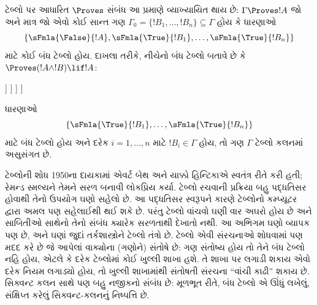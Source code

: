 ટેબ્લો પર આધારિત $\Proves$ સંબંધ આ પ્રમાણે વ્યાખ્યાયિત થાય છે:
$\Gamma \Proves !A$ જો અને માત્ર જો એવો કોઈ સાન્ત ગણ
$\Gamma_0 = \{!B_1, \dots, !B_n\} \subseteq \Gamma$ હોય કે ધારણાઓ
\[
\{\sFmla{\False}{!A}, \sFmla{\True}{!B_1}, \dots, \sFmla{\True}{!B_n}\}
\]
માટે કોઈ બંધ ટેબ્લો હોય. દાખલા તરીકે, નીચેનો બંધ ટેબ્લો
બતાવે છે કે $\Proves (!A \land !B) \lif !A$:
\begin{oltableau}
  [\sFmla{\False}{(\formula{A} \land \formula{B}) \lif \formula{A}}, just = \TAss
    [\sFmla{\True}{\formula{A} \land \formula{B}}, just = {\TRule{\False}{\lif}[1]}
      [\sFmla{\False}{\formula{A}}, just = {\TRule{\False}{\lif}[1]}
        [\sFmla{\True}{\formula{A}}, just = {\TRule{\True}{\land}[2]}
          [\sFmla{\True}{\formula{B}}, just = {\TRule{\True}{\land}[2]}, close]
        ]
      ]
    ]
  ]
\end{oltableau}

ધારણાઓ
\[
\{\sFmla{\True}{!B_1}, \dots, \sFmla{\True}{!B_n}\}
\]
માટે બંધ ટેબ્લો હોય અને દરેક $i=1,\dots,n$ માટે
$!B_i\in\Gamma$ હોય, તો ગણ $\Gamma$ ટેબ્લો કલનમાં અસુસંગત છે.

ટેબ્લોની શોધ 1950ના દાયકામાં એવર્ટ બેથ અને યાક્કો હિન્ટિકાએ
સ્વતંત્ર રીતે કરી હતી; રેમન્ડ સ્મલ્યને તેમને સરળ બનાવી લોકપ્રિય કર્યા.
ટેબ્લો રચવાની પ્રક્રિયા બહુ પદ્ધતિસર હોવાથી તેનો ઉપયોગ ઘણો સહેલો
છે. આ પદ્ધતિસર સ્વરૂપને કારણે ટેબ્લોનો કમ્પ્યૂટર દ્વારા અમલ પણ
સહેલાઈથી થઈ શકે છે. પરંતુ ટેબ્લો વાંચવો ઘણી વાર અઘરો હોય છે અને
સાબિતીઓ સાથેનો તેનો સંબંધ ક્યારેક સરળતાથી દેખાતો નથી. આ અભિગમ ઘણો
વ્યાપક પણ છે, અને ઘણાં જુદાં તર્કશાસ્ત્રોને ટેબ્લો તંત્રો છે.
ટેબ્લો એવી સંરચનાઓ શોધવામાં પણ મદદ કરે છે જે આપેલાં
વાક્યોના (ગણોને) સંતોષે છે: ગણ સંતોષ્ય હોય તો તેને બંધ ટેબ્લો નહિ
હોય, એટલે કે દરેક ટેબ્લોમાં કોઈ ખુલ્લી શાખા હશે. તે શાખા પર
લગાડી શકાય એવો દરેક નિયમ લગાડ્યો હોય, તો ખુલ્લી શાખામાંથી સંતોષતી
સંરચના ``વાંચી કાઢી'' શકાય છે. સિક્વન્ટ કલન સાથે પણ બહુ નજીકનો
સંબંધ છે: મૂળભૂત રીતે, બંધ ટેબ્લો એ ઊંધું લખેલું, સંક્ષિપ્ત કરેલું
સિક્વન્ટ-કલનનું નિષ્પત્તિ છે.
\endgroup


